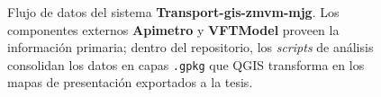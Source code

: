 \begin{figure}[htbp]







\DIFdelendFL \DIFaddbeginFL {}
\DIFaddendFL \caption[Pipeline de producción cartográfica de Transport-gis]%
  {Flujo de datos del sistema \textbf{Transport-gis-zmvm-mjg}. 
  Los componentes externos \textbf{Apimetro} y \textbf{VFTModel} proveen la información primaria; 
  dentro del repositorio, los \textit{scripts} de análisis consolidan los datos en capas \texttt{.gpkg} 
  que QGIS transforma en los mapas de presentación exportados a la tesis.}
\label{fig:tg-pipeline}
\end{figure}


